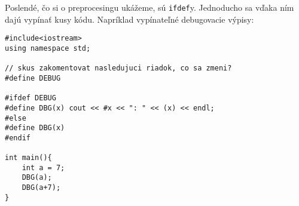 Poslendé, čo si o preprocesingu ukážeme, sú \verb!ifdef!y. Jednoducho sa vďaka
ním dajú vypínať kusy kódu. Napríklad vypínateľné debugovacie výpisy: 

\begin{lstlisting}
#include<iostream>
using namespace std;

// skus zakomentovat nasledujuci riadok, co sa zmeni?
#define DEBUG

#ifdef DEBUG
#define DBG(x) cout << #x << ": " << (x) << endl;
#else
#define DBG(x)
#endif

int main(){
    int a = 7;
    DBG(a);
    DBG(a+7);
}
\end{lstlisting}




